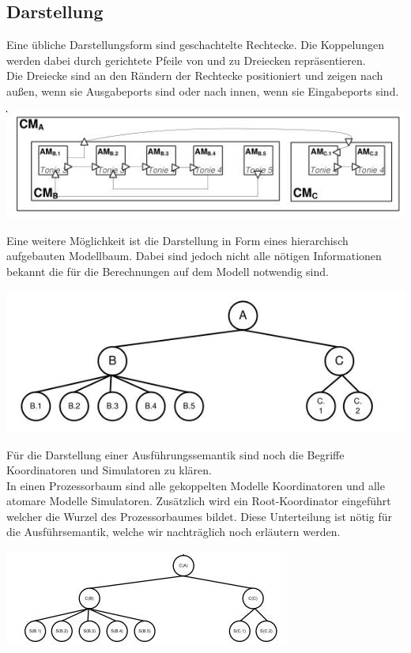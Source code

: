 \documentclass[11pt, fleqn, a4paper, leqno]{scrartcl} %
\begin{document}
	\subsection{Darstellung}
		Eine übliche Darstellungsform sind geschachtelte Rechtecke. Die Koppelungen werden dabei durch gerichtete Pfeile von und zu Dreiecken repräsentieren.\\
		Die Dreiecke sind an den Rändern der Rechtecke positioniert und zeigen nach außen, wenn sie Ausgabeports sind oder nach innen, wenn sie Eingabeports sind.
		\begin{center}
			\includegraphics[scale=0.6]{images/devs-boxes.jpg}
		\end{center}
		Eine weitere Möglichkeit ist die Darstellung in Form eines hierarchisch aufgebauten Modellbaum. Dabei sind jedoch nicht alle nötigen Informationen bekannt die für die Berechnungen auf dem Modell notwendig sind.
		\begin{center}
			\includegraphics[scale=0.5]{images/devs-baum.jpg}
		\end{center}
		Für die Darstellung einer Ausführungssemantik sind noch die Begriffe Koordinatoren und Simulatoren zu klären.\\
		In einen Prozessorbaum sind alle gekoppelten Modelle Koordinatoren und alle atomare Modelle Simulatoren. Zusätzlich wird ein Root-Koordinator eingeführt welcher die Wurzel des Prozessorbaumes bildet. Diese Unterteilung ist nötig für die Ausführsemantik, welche wir nachträglich noch erläutern werden.
	\begin{center}
			\includegraphics[scale=0.5]{images/devs-prozessorbaum.jpg}
	\end{center}
\end{document}
